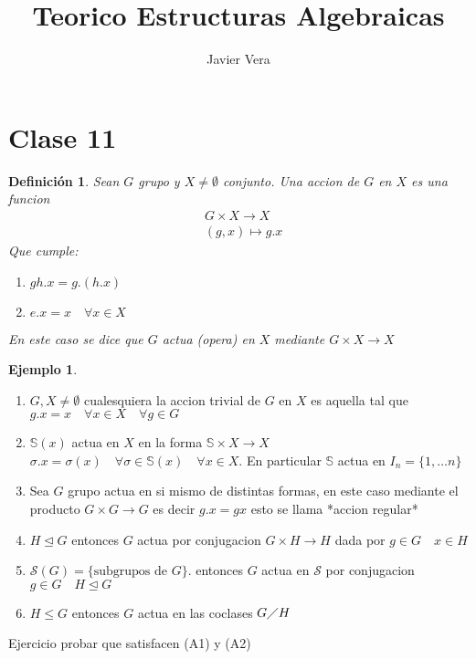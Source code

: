 \documentclass[10pt]{extarticle}
\theoremstyle{break}
\newtheorem{definition}{Definición}[section]
\theoremstyle{definition}
\newtheorem{example}{Ejemplo}[section]
\begin{document}
\title{Teorico Estructuras Algebraicas}
\author{Javier Vera}
\maketitle

\section{Clase 11}
\begin{definition}
	Sean $G$ grupo y $X\neq\emptyset$ conjunto. Una accion de $G$ en $X$ es una funcion
	\begin{align} 
	& G\times X\longrightarrow X \nonumber\\
	& (g,x)\longmapsto g.x \nonumber
	\end{align}
	Que cumple:

	\begin{enumerate}
		\item $gh.x=g.(h.x)$
		\item $e.x=x\quad\forall x\in X$
	\end{enumerate}
En este caso se dice que $G$ actua (opera) en $X$ mediante $G\times X\longrightarrow X$
\end{definition}

\begin{example}
	\begin{enumerate}
		\item $G,X\neq\emptyset$ cualesquiera la accion trivial de $G$ en $X$ es aquella tal que $g.x=x\quad\forall x\in X\quad\forall g\in G$
	  	\item $\mathbb{S}(x)$ actua en $X$ en la forma $\mathbb{S}\times X\longrightarrow X$ $\sigma.x=\sigma(x)\quad\forall \sigma\in \mathbb{S}(x)\quad\forall x\in X$. En particular $\mathbb{S}$ actua en $I_{n}=\{ 1,\ldots n \}$
		\item Sea $G$ grupo actua en si mismo de distintas formas, en este caso mediante el producto $G\times G \longrightarrow G$ es decir $g.x=gx$ esto se llama *accion regular*
		\item $H\trianglelefteq G$ entonces $G$ actua por conjugacion $G\times H \longrightarrow H$ dada por $g\in G\quad x\in H$
		\item $\mathcal{S}(G)=\{ \text{subgrupos de } G \}$. entonces $G$ actua en $\mathcal{S}$ por conjugacion $g\in G\quad H\trianglelefteq G$
		\item  $H\leq G$ entonces $G$ actua en las coclases $G\diagup H$
	\end{enumerate}
	Ejercicio probar que satisfacen (A1) y (A2)
\end{example}
\end{document}
